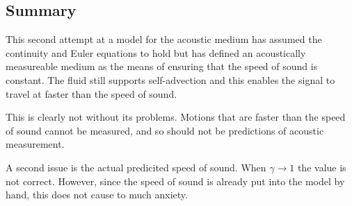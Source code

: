 \subsection{Summary}

This second attempt at a model for the acoustic medium has assumed the continuity and Euler equations to hold
but has defined an acoustically measureable medium as the means of ensuring that the speed of sound is constant.
The fluid still supports self-advection and this enables the signal to travel at faster than the speed of sound.

This is clearly not without its problems.
Motions that are faster than the speed of sound cannot be measured,
and so should not be predictions of acoustic measurement.

A second issue is the actual predicited speed of sound.
When $\gamma \rightarrow 1$ the value is not correct.
However, since the speed of sound is
already put into the model by hand,
this does not cause to much anxiety.









